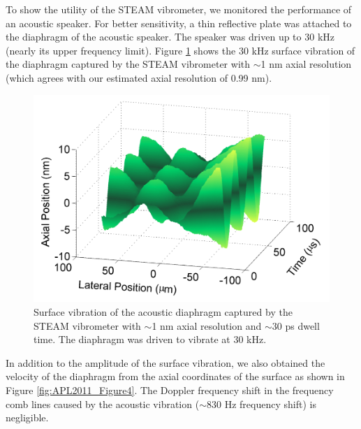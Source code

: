 To show the utility of the STEAM vibrometer, we monitored the performance of an acoustic speaker. For better sensitivity, a thin reflective plate was attached to the diaphragm of the acoustic speaker. The speaker was driven up to 30 kHz (nearly its upper frequency limit). Figure \ref{fig:APL2011_Figure3} shows the 30 kHz surface vibration of the diaphragm captured by the STEAM vibrometer with $\sim$1 nm axial resolution (which agrees with our estimated axial resolution of 0.99 nm).

\begin{figure}[htb!]
\centering
\includegraphics[scale=1]{APL2011/Figure3.png}
\caption{Surface vibration of the acoustic diaphragm captured by the STEAM vibrometer with $\sim$1 nm axial resolution and $\sim$30 ps dwell time. The diaphragm was driven to vibrate at 30 kHz.}
\label{fig:APL2011_Figure3}
\end{figure}

In addition to the amplitude of the surface vibration, we also obtained the velocity of the diaphragm from the axial coordinates of the surface as shown in Figure \ref{fig:APL2011_Figure4}. The Doppler frequency shift in the frequency comb lines caused by the acoustic vibration ($\sim$830 Hz frequency shift) is negligible.


